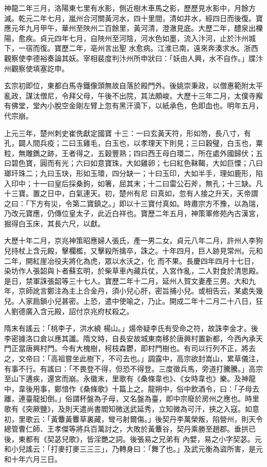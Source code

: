\begin{pinyinscope}
 神龍二年三月，洛陽東七里有水影，側近樹木車馬之影，歷歷見水影中，月餘方滅。乾元二年七月，嵐州合河關黃河水，四十里間，清如井水，經四日而後復。寶應元年九月甲午，華州至陜州二百餘里，黃河清，澄澈見底。大歷二年，醴泉出櫟陽，愈疾。貞元四年七月，自陜州至河陰，河水色如墨，流入汴河，止於汴州城下，一宿而復。寶歷二年，亳州言出聖
 水愈病。江淮已南，遠來奔湊求水。浙西觀察使李德裕奏論其妖。宰相裴度判汴州所申狀曰：「妖由人興，水不自作。」牒汴州觀察使填塞訖申。



 玄宗初即位，東都白馬寺鐵像頭無故自落於殿門外。後姚崇秉政，以僧惠範附太平亂政，謀汰僧尼，令拜父母，午後不出院，其法頗峻。大歷十三年二月，太僕寺廨有佛堂，堂內小脫空金剛左臂上忽有黑汗滴下，以紙承色，色即血也。明年五月，代宗崩。



 上元三年，楚州刺史崔侁獻定國寶
 十三：一曰玄黃天符，形如笏，長八寸，有孔，闢人間兵疫；二曰玉雞毛，白玉也，以孝理天下則見；三曰穀璧，白玉也，粟粒，無雕鐫之跡，王者得之，五穀豐熟；四曰西王母白環二，所在處外國歸伏；五曰碧色寶，圓而有光；六曰如意寶珠，大如雞卵；七曰紅色靺鞨，大如巨慄；八曰瑯玕珠二；九曰玉玦，形如玉環，四分缺一；十曰玉印，大如半手，理如鹿形，陷入印中；十一曰皇后採桑鉤，如箸，屈其末；十二曰雷公石斧，無孔；十三缺。凡十三寶。置之日中，白氣連天。初，楚州有尼
 曰真如，忽有人接之升天，天帝謂之曰：「下方有災，令第二寶鎮之。」即以十三寶付真如。時肅宗方不豫，以為瑞，乃改元寶應，仍傳位皇太子，此近白祥也。寶歷二年五月，神策軍修苑內古漢宮，掘得白玉床，其長六尺，以獻。



 大歷十年二月，京兆神策昭應婦人張氏，產一男二女。貞元八年二月，許州人李狗兒持杖上含元殿，擊欄檻，又擊殺所擒卒，誅之。十年四月，巨人跡見常州。元和二年，開紅崖冶役夫將化為虎，眾以水沃之，化
 而不果。長慶四年四月十七日，染坊作人張韶與卜者蘇玄明，於柴草車內藏兵仗，入宮作亂，二人對食於清思殿。是日，禁軍誅張韶等三十七人。寶歷二年十二月，延州人賀文妻產三男。大和九年，京師訛言鄭注為主上合金丹，須小兒心肝，密旨捕小兒。或相告云，某處失幾兒。人家扃鎖小兒甚密。上恐，遣中使喻之，乃止。開成二年十二月二十八日，狂人劉德廣入含元殿，詔付京兆府杖殺之。



 隋末有謠云：「桃李子，洪水繞
 楊山。」煬帝疑李氏有受命之符，故誅李金才。後李密據洛口倉以應其讖。隋文時，自長安故城東南移於唐興村置新都，今西內承天門正當唐興村門。今有大槐樹，柯枝森鬱，即村門樹也。有司以行列不正，將去之，文帝曰：「高祖嘗坐此樹下，不可去也。」調露中，高宗欲封嵩山，累草儀注，有事不行。有謠曰：「不畏登不得，但恐不得登。三度徵兵馬，旁道打騰騰。」高宗至山下遘疾，還宮而崩。永徽末，里歌有《桑條韋也》、《女時韋也》樂。及神龍
 中，韋後用事，鄭愔作《桑條歌》十篇上之。龍朔中，俗中飲酒令，曰：「子母去離，連臺龍抝倒。」俗謂杯盤為子母，又名盤為臺，即中宗廢於房州之應也。時里歌有《突厥鹽》，及則天遣尚書閻知微送武延秀，立知微為可汗，挾之入寇。如意初，里歌云：「黃麞黃麞草裏藏，彎弓射爾傷。」後契丹李萬榮叛，陷營州，則天令總管曹仁師、王孝傑等將兵百萬討之，大敗於黃麞谷，契丹乘勝至趙郡。垂拱已後，東都有《契苾兒歌》，皆淫艷之詞。後張易之兄弟有
 內嬖，易之小字契苾。元和小兒謠云：「打麥打麥三三三」，乃轉身曰：「舞了也。」及武元衡為盜所害，是元和十年六月三日。




\end{pinyinscope}
